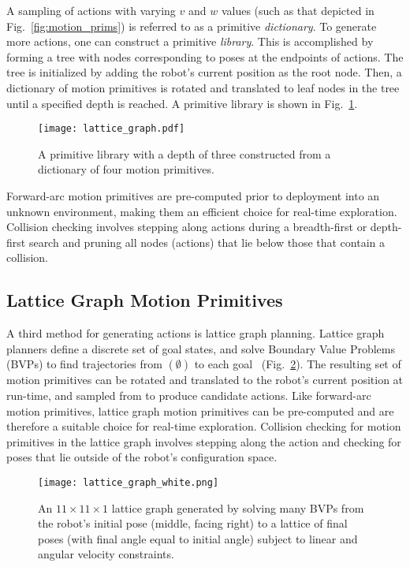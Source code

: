 A sampling of actions with varying $v$ and $w$ values (such as that depicted in
Fig.~\ref{fig:motion_prims}) is referred to as a
primitive \textit{dictionary}. To generate more actions, one can construct a
primitive \textit{library}. This is accomplished by forming a tree with nodes
corresponding to poses at the endpoints of actions. The tree is initialized by adding
the robot's current position as the root node. Then, a dictionary of motion
primitives is rotated and translated to leaf nodes in the tree until a specified
depth is reached. A primitive library is shown in
Fig.~\ref{fig:primitive_library}.
%
\begin{figure}
  \centering
  \texttt{[image: lattice\_graph.pdf]}
  \caption[A forward-arc motion primitive library.]{A primitive library with a depth of three constructed from a
  dictionary of four motion primitives. \label{fig:primitive_library}}
\end{figure}

Forward-arc motion primitives are pre-computed prior to deployment into an
unknown environment, making them an efficient choice for real-time exploration. Collision
checking involves stepping along actions during a breadth-first or depth-first search and
pruning all nodes (actions) that lie below those that contain a collision.

\subsection{Lattice Graph Motion Primitives}
\label{subsec:lg_motion_primitives}

A third method for generating actions is lattice graph planning. Lattice graph
planners define a discrete set of goal states, and
solve Boundary Value Problems (BVPs) to find trajectories from $(\emptyset)$ to
each goal~\cite{pivtoraiko2005generating,pivtoraiko2009differentially,pivtoraiko2013incremental}
(Fig.~\ref{fig:lattice_graph}). The resulting set of motion primitives can
be rotated and translated to the robot's current position at run-time, and sampled
from to produce candidate actions. Like forward-arc motion primitives, lattice
graph motion primitives can be pre-computed and are therefore a suitable choice for
real-time exploration. Collision checking for motion primitives in the lattice
graph involves stepping along the action and checking for poses that lie outside
of the robot's configuration space.
%
\begin{figure}[h]
  \centering
  \texttt{[image: lattice\_graph\_white.png]}
  \caption[A lattice graph of motion primitives.]{An $11\times 11 \times 1$ lattice graph generated by solving many
    BVPs
  from the robot's initial pose (middle, facing right) to a lattice of final
poses (with final angle equal to initial angle) subject to linear and angular velocity
constraints. \label{fig:lattice_graph}}
\end{figure}

